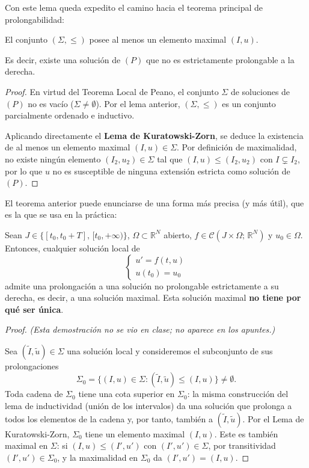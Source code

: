 Con este lema queda expedito el camino hacia el teorema principal de prolongabilidad:

\begin{teorema}
    El conjunto $(\Sigma, \leq)$ posee al menos un elemento maximal $(I, u)$.
    
    Es decir, existe una solución de $(P)$ que no es estrictamente prolongable a la derecha.
\end{teorema}

\begin{proof}
    En virtud del Teorema Local de Peano, el conjunto $\Sigma$ de soluciones de $(P)$ no es vacío ($\Sigma \neq \emptyset$). Por el lema anterior, $(\Sigma, \leq)$ es un conjunto parcialmente ordenado e inductivo.
    
    Aplicando directamente el \textbf{Lema de Kuratowski-Zorn}, se deduce la existencia de al menos un elemento maximal $(I, u) \in \Sigma$. Por definición de maximalidad, no existe ningún elemento $(I_2, u_2) \in \Sigma$ tal que $(I, u) \leq (I_2, u_2)$ con $I \subsetneq I_2$, por lo que $u$ no es susceptible de ninguna extensión estricta como solución de $(P)$.
\end{proof}


El teorema anterior puede enunciarse de una forma más precisa (y más útil), que es la que se usa en la práctica:

\begin{teorema}
    Sean $J \in \{ [t_0, t_0 + T], \, [t_0, +\infty) \}$, $\Omega \subset \mathbb{R}^N$ abierto, $f \in \mathcal{C}(J \times \Omega; \, \mathbb{R}^N)$ y $u_0 \in \Omega$. Entonces, cualquier solución local de
    \[
        \begin{cases}
            u' = f(t, u) \\
            u(t_0) = u_0
        \end{cases}
    \]
    admite una prolongación a una solución no prolongable estrictamente a su derecha, es decir, a una solución maximal. Esta solución maximal \textbf{no tiene por qué ser única}.
\end{teorema}

\begin{proof}
    \textit{(Esta demostración no se vio en clase; no aparece en los apuntes.)}

    Sea $(\tilde{I}, \tilde{u}) \in \Sigma$ una solución local y consideremos el subconjunto de sus prolongaciones
    \[
        \Sigma_0 = \{ (I, u) \in \Sigma : (\tilde{I}, \tilde{u}) \leq (I, u) \} \neq \emptyset.
    \]
    Toda cadena de $\Sigma_0$ tiene una cota superior en $\Sigma_0$: la misma construcción del lema de inductividad (unión de los intervalos) da una solución que prolonga a todos los elementos de la cadena y, por tanto, también a $(\tilde{I}, \tilde{u})$. Por el Lema de Kuratowski-Zorn, $\Sigma_0$ tiene un elemento maximal $(I, u)$. Este es también maximal en $\Sigma$: si $(I, u) \leq (I', u')$ con $(I', u') \in \Sigma$, por transitividad $(I', u') \in \Sigma_0$, y la maximalidad en $\Sigma_0$ da $(I', u') = (I, u)$.
\end{proof}

